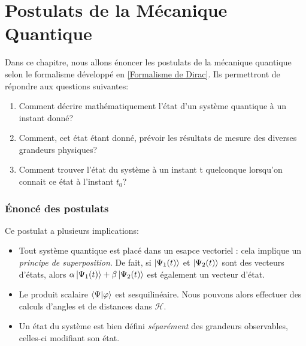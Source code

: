 \documentclass[../notesdecours.tex]{subfiles}
\begin{document}
\newpage
\part{Postulats de la Mécanique Quantique}
\label{Postulats de la Mecanique Quantique}
Dans ce chapitre, nous allons énoncer les postulats de la mécanique quantique selon le formalisme développé en \ref{Formalisme de Dirac}. Ils permettront de répondre aux questions suivantes:
\begin{enumerate}
\item Comment décrire mathématiquement l'état d'un système quantique à un instant donné?
\item Comment, cet état étant donné, prévoir les résultats de mesure des diverses grandeurs physiques?
\item Comment trouver l'état du système à un instant t quelconque lorsqu'on connait  ce état à l'instant $t_0$?
\end{enumerate}
\section{Énoncé des postulats}

\begin{center}
\end{center}
Ce postulat a plusieurs implications:
\begin{itemize}
\item Tout système quantique est placé dans un esapce vectoriel : cela implique un \textit{principe de superposition}. De fait, si $\ket{\Psi_1 (t)}$ et $\ket{\Psi_2 (t)}$ sont des vecteurs d'états, alors $\alpha \ket{\Psi_1 (t)} + \beta\ket{\Psi_2 (t)}$ est également un vecteur d'état.
\item Le produit scalaire $\braket{\Psi|\varphi}$ est sesquilinéaire. Nous pouvons alors effectuer des calculs d'angles et de distances dans $\mathcal{H}$.
\item Un état du système est bien défini \textit{séparément} des grandeurs observables, celles-ci modifiant son état.
\end{itemize}
\end{document}
